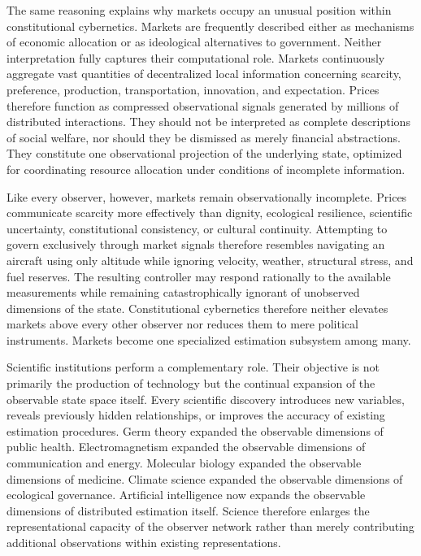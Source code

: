 \documentclass[12pt,a4paper]{article}
\begin{document}
The same reasoning explains why markets occupy an unusual position within constitutional cybernetics. Markets are frequently described either as mechanisms of economic allocation or as ideological alternatives to government. Neither interpretation fully captures their computational role. Markets continuously aggregate vast quantities of decentralized local information concerning scarcity, preference, production, transportation, innovation, and expectation. Prices therefore function as compressed observational signals generated by millions of distributed interactions. They should not be interpreted as complete descriptions of social welfare, nor should they be dismissed as merely financial abstractions. They constitute one observational projection of the underlying state, optimized for coordinating resource allocation under conditions of incomplete information.

Like every observer, however, markets remain observationally incomplete. Prices communicate scarcity more effectively than dignity, ecological resilience, scientific uncertainty, constitutional consistency, or cultural continuity. Attempting to govern exclusively through market signals therefore resembles navigating an aircraft using only altitude while ignoring velocity, weather, structural stress, and fuel reserves. The resulting controller may respond rationally to the available measurements while remaining catastrophically ignorant of unobserved dimensions of the state. Constitutional cybernetics therefore neither elevates markets above every other observer nor reduces them to mere political instruments. Markets become one specialized estimation subsystem among many.

Scientific institutions perform a complementary role. Their objective is not primarily the production of technology but the continual expansion of the observable state space itself. Every scientific discovery introduces new variables, reveals previously hidden relationships, or improves the accuracy of existing estimation procedures. Germ theory expanded the observable dimensions of public health. Electromagnetism expanded the observable dimensions of communication and energy. Molecular biology expanded the observable dimensions of medicine. Climate science expanded the observable dimensions of ecological governance. Artificial intelligence now expands the observable dimensions of distributed estimation itself. Science therefore enlarges the representational capacity of the observer network rather than merely contributing additional observations within existing representations.
\end{document}
